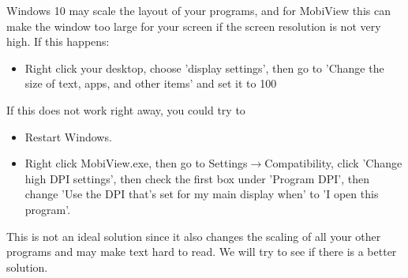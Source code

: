 \documentclass[11pt]{article}
\theoremstyle{definition}
\begin{document}
Windows 10 may scale the layout of your programs, and for MobiView this can make the window too large for your screen if the screen resolution is not very high. If this happens:
\begin{itemize}
\item Right click your desktop, choose 'display settings', then go to 'Change the size of text, apps, and other items' and set it to 100%
\end{itemize}
If this does not work right away, you could try to
\begin{itemize}
\item Restart Windows.
\item Right click MobiView.exe, then go to Settings$\rightarrow$Compatibility, click 'Change high DPI settings', then check the first box under 'Program DPI', then change 'Use the DPI that's set for my main display when' to 'I open this program'.
\end{itemize}
This is not an ideal solution since it also changes the scaling of all your other programs and may make text hard to read. We will try to see if there is a better solution.



\end{document}
